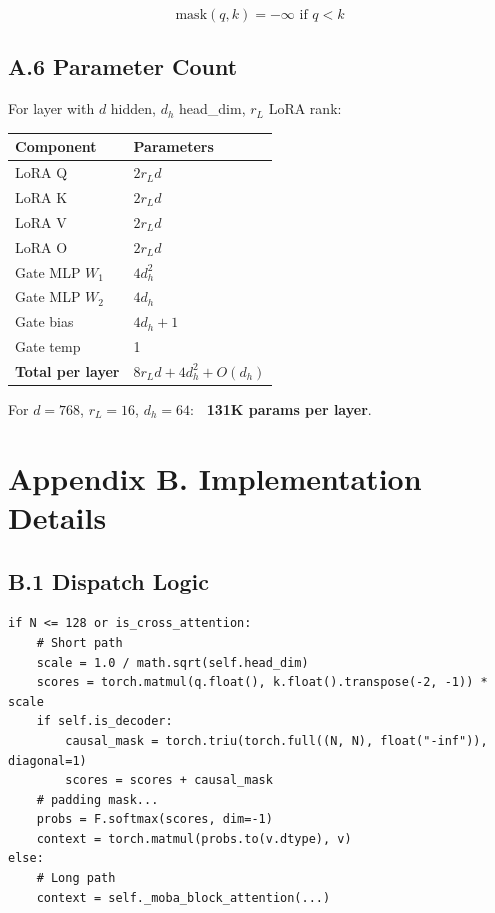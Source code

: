 \[
\text{mask}(q, k) = -\infty \text{ if } q < k
\tag{A.5}
\]

\subsection{A.6 Parameter Count}

For layer with $d$ hidden, $d_h$ head\_dim, $r_L$ LoRA rank:

\begin{table}[H]
\centering
\small
\begin{tabular}{ll}
\toprule
\textbf{Component} & \textbf{Parameters} \\
\midrule
LoRA Q & $2 r_L d$ \\
LoRA K & $2 r_L d$ \\
LoRA V & $2 r_L d$ \\
LoRA O & $2 r_L d$ \\
Gate MLP $W_1$ & $4 d_h^2$ \\
Gate MLP $W_2$ & $4 d_h$ \\
Gate bias & $4 d_h + 1$ \\
Gate temp & 1 \\
\textbf{Total per layer} & $8 r_L d + 4 d_h^2 + O(d_h)$ \\
\bottomrule
\end{tabular}
\end{table}

For $d = 768$, $r_L = 16$, $d_h = 64$: \textbf{~131K params per layer}.



\section{Appendix B. Implementation Details}

\subsection{B.1 Dispatch Logic}

\begin{lstlisting}
if N <= 128 or is_cross_attention:
    # Short path
    scale = 1.0 / math.sqrt(self.head_dim)
    scores = torch.matmul(q.float(), k.float().transpose(-2, -1)) * scale
    if self.is_decoder:
        causal_mask = torch.triu(torch.full((N, N), float("-inf")), diagonal=1)
        scores = scores + causal_mask
    # padding mask...
    probs = F.softmax(scores, dim=-1)
    context = torch.matmul(probs.to(v.dtype), v)
else:
    # Long path
    context = self._moba_block_attention(...)
\end{lstlisting}

